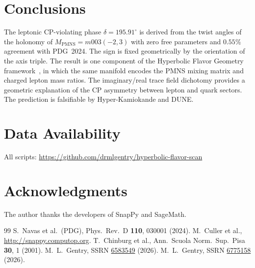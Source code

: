 \documentclass[11pt,a4paper]{article}
\theoremstyle{remark}
\newcommand{\MPMNS}{M_{\mathrm{PMNS}}}
\begin{document}
\section{Conclusions}
\label{sec:conclusions}

The leptonic CP-violating phase $\delta=195.91^\circ$ is derived
from the twist angles of the holonomy of $\MPMNS=m003(-2,3)$
with zero free parameters and $0.55\%$ agreement with PDG~2024.
The sign is fixed geometrically by the orientation of the axis
triple. The result is one component of the Hyperbolic Flavor Geometry
framework~\cite{Gentry:Unified}, in which the same manifold encodes
the PMNS mixing matrix and charged lepton mass ratios.
The imaginary/real trace field dichotomy provides a geometric
explanation of the CP asymmetry between lepton and quark sectors.
The prediction is falsifiable by Hyper-Kamiokande and DUNE.

\section*{Data Availability}
All scripts: \url{https://github.com/drmlgentry/hyperbolic-flavor-scan}

\section*{Acknowledgments}
The author thanks the developers of SnapPy and SageMath.

\begin{thebibliography}{99}
S.~Navas et al.\ (PDG), Phys.\ Rev.\ D \textbf{110}, 030001 (2024).
M.~Culler et al., \url{http://snappy.computop.org}.
T.~Chinburg et al.,
Ann.\ Scuola Norm.\ Sup.\ Pisa \textbf{30}, 1 (2001).
M.~L.~Gentry,
SSRN \href{https://doi.org/10.2139/ssrn.6583549}{6583549} (2026).
M.~L.~Gentry,
SSRN \href{https://doi.org/10.2139/ssrn.6775158}{6775158} (2026).
\end{thebibliography}
\end{document}
